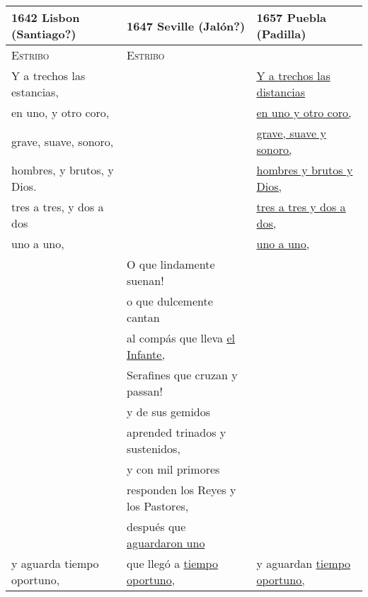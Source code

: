 \documentclass[class=vcfloat,preview]{standalone}
\newcommand{\strophe}{\hspace{1em}}
\begin{document}
\begin{tabular}{lll}
    \toprule
    1642 Lisbon (Santiago?) & 
    1647 Seville (Jalón?) & 
    1657 Puebla (Padilla) \\
    \midrule 
 
    \textsc{Estribo} &
    \textsc{Estribo} &
    \\

    \strophe{} Y a trechos las estancias, &
    &
    \strophe{} \uline{Y a trechos las distancias} \\

    en uno, y otro coro, &
    &
    \uline{en uno y otro coro,} \\

    grave, suave, sonoro, &
    &
    \uline{grave, suave y sonoro,} \\

    hombres, y brutos, y Dios. &
    &
    \uline{hombres y brutos y Dios,} \\

    tres a tres, y dos a dos &
    &
    \uline{tres a tres y dos a dos,} \\

    uno a uno, &
    &
    \uline{uno a uno,} \\
    
    & 
    O que lindamente suenan! 
    & \\
    
    & 
    o que dulcemente cantan 
    & \\
    
    & 
    al compás que lleva \uline{el Infante,} 
    & \\
    
    & 
    Serafines que cruzan y passan! 
    & \\
    
    & 
    y de sus gemidos 
    & \\
    
    & 
    aprended trinados y sustenidos, 
    & \\
    
    & 
    y con mil primores 
    & \\ 
    
    & 
    responden los Reyes y los Pastores, 
    & \\
 
    & 
    después que \uline{aguardaron uno} 
    & \\

    y aguarda tiempo oportuno, &
    que llegó a \uline{tiempo oportuno}, &
    y aguardan \uline{tiempo oportuno,} \\ 
    

\end{tabular}
\end{document}
